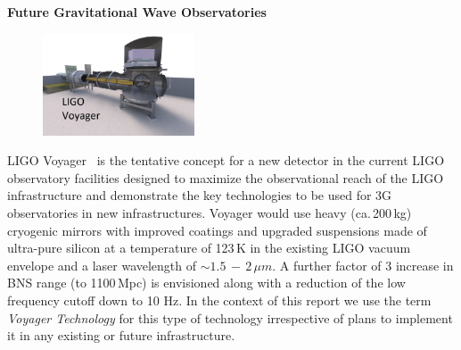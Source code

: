 \begin{DetBox}{\bf Future Gravitational Wave Observatories}
\begin{tcolorbox}[standard jigsaw,colframe=azure!70!black,colback=azure!20!white,opacityback=0.6,coltext=black, size=small, title= LIGO Voyager]
\begin{figure}
\vspace{-10pt}
\includegraphics*[width=0.4\textwidth]{Figures/Voyager_Thumb.jpg}
\label{fig:Voyager_Thumb}
\vspace{-20pt}
\end{figure}

LIGO Voyager~\cite{Voyager:Inst,VoyagerDCC2018, VoyagerDCC2019} is the tentative concept for a new detector in the current LIGO observatory facilities designed to maximize the observational reach of the LIGO infrastructure and demonstrate the key technologies to be used for 3G observatories in new infrastructures.
Voyager would use heavy (ca.\,200\,kg) cryogenic mirrors with improved coatings and upgraded suspensions made of ultra-pure silicon at a temperature of 123\,K in the existing LIGO vacuum envelope and a laser wavelength of $\sim1.5\,-\,2\,\mu m$. 
A further factor of 3 increase in BNS range (to 1100\,Mpc) is envisioned along with a reduction of the low frequency cutoff down to 10 Hz. In the context of this report we use the term \emph{Voyager Technology} for this type of technology irrespective of plans to implement it in any existing or future infrastructure.
\end{tcolorbox}

\end{DetBox}
\newpage 


